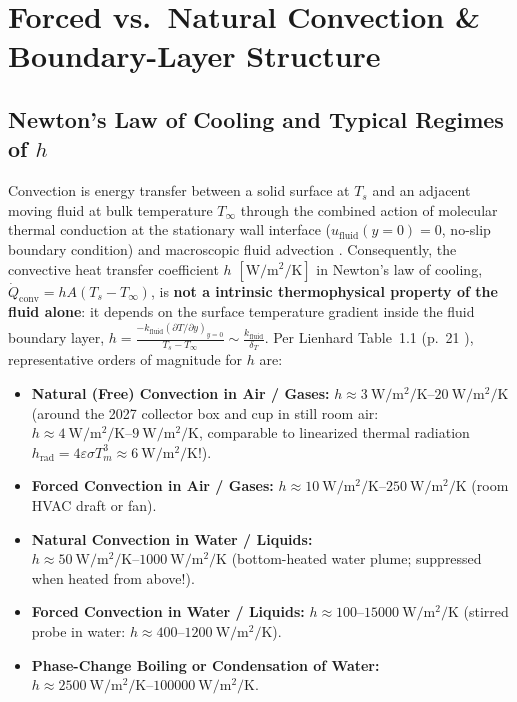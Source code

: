 \section{Forced vs.\ Natural Convection \& Boundary-Layer Structure}
\label{sec:11.1}

\subsection{Newton's Law of Cooling and Typical Regimes of $h$}
Convection is energy transfer between a solid surface at $T_s$ and an adjacent moving fluid at bulk temperature $T_\infty$ through the combined action of molecular thermal conduction at the stationary wall interface ($u_{\mathrm{fluid}}(y=0) = 0$, no-slip boundary condition) and macroscopic fluid advection . Consequently, the convective heat transfer coefficient $h$ $[\si{\watt\per\square\meter\per\kelvin}]$ in Newton's law of cooling, $\dot{Q}_{\mathrm{conv}} = h A (T_s - T_\infty)$, is \textbf{not a intrinsic thermophysical property of the fluid alone}: it depends on the surface temperature gradient inside the fluid boundary layer, $h = \frac{-k_{\mathrm{fluid}}(\partial T/\partial y)_{y=0}}{T_s - T_\infty} \sim \frac{k_{\mathrm{fluid}}}{\delta_T}$. Per Lienhard Table~1.1 (p.~21 ), representative orders of magnitude for $h$ are:
\begin{itemize}
  \item \textbf{Natural (Free) Convection in Air / Gases:} $h \approx \SIrange{3}{20}{\watt\per\square\meter\per\kelvin}$ (around the 2027 collector box and cup in still room air: $h \approx \SIrange{4}{9}{\watt\per\square\meter\per\kelvin}$, comparable to linearized thermal radiation $h_{\mathrm{rad}} = 4\varepsilon\sigma T_m^3 \approx \SI{6}{\watt\per\square\meter\per\kelvin}$!).
  \item \textbf{Forced Convection in Air / Gases:} $h \approx \SIrange{10}{250}{\watt\per\square\meter\per\kelvin}$ (room HVAC draft or fan).
  \item \textbf{Natural Convection in Water / Liquids:} $h \approx \SIrange{50}{1000}{\watt\per\square\meter\per\kelvin}$ (bottom-heated water plume; suppressed when heated from above!).
  \item \textbf{Forced Convection in Water / Liquids:} $h \approx 100\text{--}\SI{15000}{\watt\per\square\meter\per\kelvin}$ (stirred probe in water: $h \approx 400\text{--}\SI{1200}{\watt\per\square\meter\per\kelvin}$).
  \item \textbf{Phase-Change Boiling or Condensation of Water:} $h \approx \SIrange{2500}{100000}{\watt\per\square\meter\per\kelvin}$.
\end{itemize}

